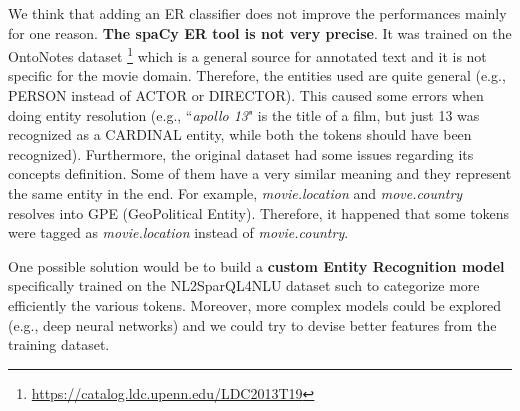 \documentclass[11pt,a4paper]{article}
\begin{document}
We think that adding an ER classifier does not improve the performances mainly for one reason. \textbf{The spaCy ER tool is not very precise}. It was trained on the OntoNotes dataset \footnote{\url{https://catalog.ldc.upenn.edu/LDC2013T19}} which is a general source for annotated text and it is not specific for the movie domain. Therefore, the entities used are quite general (e.g., PERSON instead of ACTOR or DIRECTOR). This caused some errors when doing entity resolution (e.g., ``\textit{apollo 13}" is the title of a film, but just 13 was recognized as a CARDINAL entity, while both the tokens should have been recognized).
Furthermore, the original dataset had some issues regarding its concepts definition. Some of them have a very similar meaning and they represent the same entity in the end. For example, \textit{movie.location} and \textit{move.country} resolves into GPE (GeoPolitical Entity). Therefore, it happened that some tokens were tagged as \textit{movie.location} instead of \textit{movie.country}. 
 
One possible solution would be to build a \textbf{custom Entity Recognition model} specifically trained on the NL2SparQL4NLU dataset such to categorize more efficiently the various tokens. Moreover, more complex models \citep{gobbi2018concept} could be explored (e.g., deep neural networks)  and we could try to devise better features from the training dataset.



\end{document}
